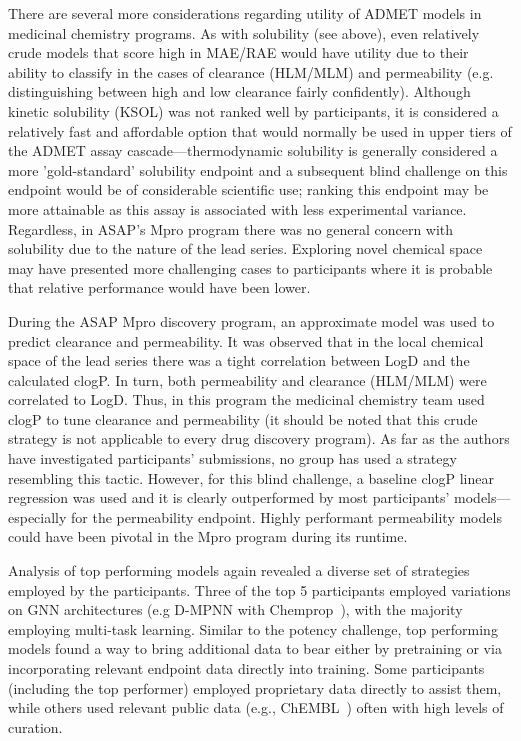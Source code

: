 \documentclass[journal=jcim,manuscript=article]{achemso}
\begin{document}
There are several more considerations regarding utility of ADMET models in medicinal chemistry programs. As with solubility (see above), even relatively crude models that score high in MAE/RAE would have utility due to their ability to classify in the cases of clearance (HLM/MLM) and permeability (e.g. distinguishing between high and low clearance fairly confidently). Although kinetic solubility (KSOL) was not ranked well by participants, it is considered a relatively fast and affordable option that would normally be used in upper tiers of the ADMET assay cascade---thermodynamic solubility is generally considered a more 'gold-standard' solubility endpoint and a subsequent blind challenge on this endpoint would be of considerable scientific use; ranking this endpoint may be more attainable as this assay is associated with less experimental variance.\cite{llompart_minoletti_baybekov_horvath_marcou_varnek_2024} Regardless, in ASAP's Mpro program there was no general concern with solubility due to the nature of the lead series. Exploring novel chemical space may have presented more challenging cases to participants where it is probable that relative performance would have been lower.

During the ASAP Mpro discovery program, an approximate model was used to predict clearance and permeability. It was observed that in the local chemical space of the lead series there was a tight correlation between LogD and the calculated clogP. In turn, both permeability and clearance (HLM/MLM) were correlated to LogD. Thus, in this program the medicinal chemistry team used clogP to tune clearance and permeability (it should be noted that this crude strategy is not applicable to every drug discovery program). As far as the authors have investigated participants' submissions, no group has used a strategy resembling this tactic. However, for this blind challenge, a baseline clogP linear regression was used and it is clearly outperformed by most participants' models---especially for the permeability endpoint.  Highly performant permeability models could have been pivotal in the Mpro program during its runtime. 

Analysis of top performing models again revealed a diverse set of strategies employed by the participants. Three of the top 5 participants employed variations on GNN architectures (e.g D-MPNN with Chemprop~\cite{heid2023chemprop}), with the majority employing multi-task learning. Similar to the potency challenge, top performing models found a way to bring additional data to bear either by pretraining or via incorporating relevant endpoint data directly into training. Some participants (including the top performer) employed proprietary data directly to assist them, while others used relevant public data (e.g., ChEMBL~\cite{zdrazil_2024_chembl}) often with high levels of curation.
\end{document}
